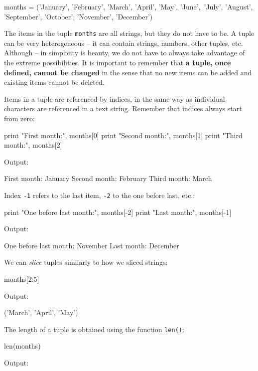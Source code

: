 \begin{bluecode}
months = ('January', 'February', 'March', 'April', 'May', 'June',\
'July', 'August', 'September', 'October', 'November', 'December')
\end{bluecode}
The items in the tuple {\tt months} are all strings, but they do not
have to be. A tuple can be very heterogeneous -- it can contain strings,
numbers, other tuples, etc. Although -- in simplicity is beauty, we
do not have to always take advantage of the extreme possibilities.
It is important to remember that {\bf a tuple, once defined, cannot 
be changed} in the sense that no new items can be added and existing 
items cannot be deleted.

Items in a tuple are referenced by indices, in the same way as individual 
characters are referenced in a text string. Remember that indices always 
start from zero:

\begin{bluecode}
print "First month:", months[0]
print "Second month:", months[1]
print "Third month:", months[2]
\end{bluecode}
Output:

\begin{greencode}
First month: January
Second month: February
Third month: March
\end{greencode}
Index {\tt -1} refers to the last item, {\tt -2} to the one before last, etc.:

\begin{bluecode}
print "One before last month:", months[-2]
print "Last month:", months[-1]
\end{bluecode}
Output:

\begin{greencode}
One before last month: November
Last month: December
\end{greencode}

\noindent
We can {\em slice} tuples similarly to how we sliced strings:

\begin{bluecode}
months[2:5]
\end{bluecode}
Output:

\begin{greencode}
('March', 'April', 'May')
\end{greencode}
The length of a tuple is obtained using the function {\tt len()}:

\begin{bluecode}
len(months)
\end{bluecode}
Output:

